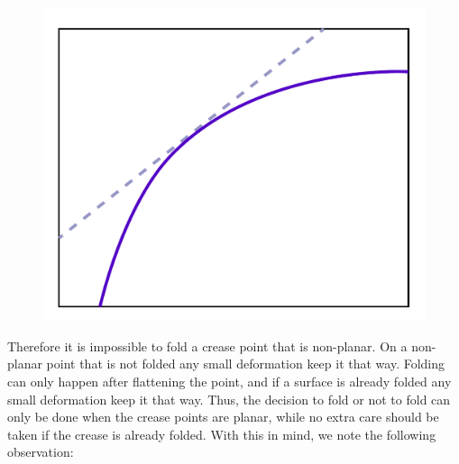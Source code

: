 \begin{figure}
  \centering
  \includegraphics[width=\linewidth]{figures/ruling_tangent_to_a_curved_fold}
\end{figure}

Therefore it is impossible to fold a crease point that is non-planar. On a non-planar point that is not folded any small deformation keep it that way. Folding can only happen after flattening the point, and if a surface is already folded any small deformation keep it that way. Thus, the decision to fold or not to fold can only be done when the crease points are planar, while no extra care should be taken if the crease is already folded. With this in mind, we note the following observation:

